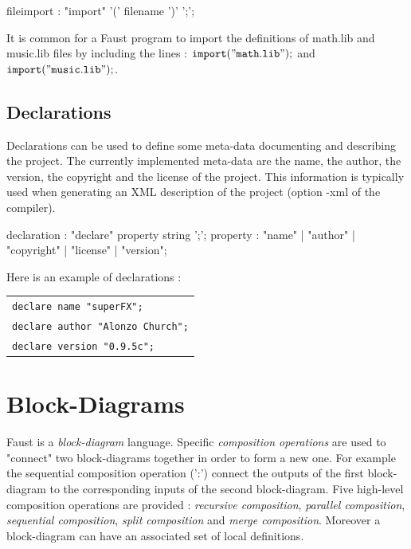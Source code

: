 \documentclass{article}
\begin{document}
\begin{rail}
fileimport : "import" '(' filename ')' ';';
\end{rail}

It is common for a Faust program to import the definitions of math.lib and music.lib files by including the lines : $\mathtt{import("math.lib");}$ and  $\mathtt{import("music.lib");}$.


\subsection{Declarations}

Declarations can be used to define some meta-data documenting and describing the project. The currently implemented meta-data are the name, the author, the version, the copyright and the license of the project. This information is typically used when generating an XML description of the project (option -xml of the compiler).

\begin{rail}
declaration : "declare" property string ';';
property : "name" | "author" | "copyright" | "license" | "version";
\end{rail}

Here is an example of declarations :

\begin{tabular}{l}
	\texttt{declare name "superFX";}\\
	\texttt{declare author "Alonzo Church";}\\
	\texttt{declare version "0.9.5c";}\\
\end{tabular}

\section{Block-Diagrams}

Faust is a \emph{block-diagram} language. Specific \emph{composition operations} are used to "connect" two block-diagrams together in order to form a new one.  For example the sequential composition operation (':') connect the outputs of the first block-diagram to the corresponding inputs of the second block-diagram. Five high-level composition operations are provided : \emph{recursive composition}, \emph{parallel composition}, \emph{sequential composition}, \emph{split composition} and \emph{merge composition}. Moreover a block-diagram can have an associated set of local definitions.

\vspace{5 mm}
\end{document}
